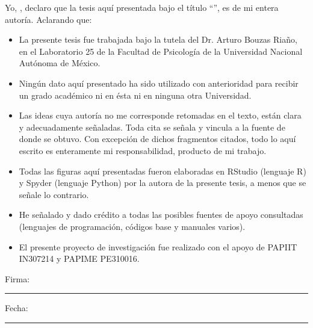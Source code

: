 \documentclass[
11pt, %
spanish, %
singlespacing, %
headsepline, %
]{MastersDoctoralThesis} %
\begin{document}
\begin{declaration}
\addchaptertocentry{\authorshipname} %
\noindent Yo, \authorname, declaro que la tesis aquí presentada bajo el título \enquote{\ttitle}, es de mi entera autoría. Aclarando que:\\

\begin{itemize} 
\item La presente tesis fue trabajada bajo la tutela del Dr. Arturo Bouzas Riaño, en el Laboratorio 25 de la Facultad de Psicología de la Universidad Nacional Autónoma de México.
\item Ningún dato aquí presentado ha sido utilizado con anterioridad para recibir un grado académico ni en ésta ni en ninguna otra Universidad. 
\item Las ideas cuya autoría no me corresponde retomadas en el texto, están clara y adecuadamente señaladas. Toda cita se señala y vincula a la fuente de donde se obtuvo. Con excepción de dichos fragmentos citados, todo lo aquí escrito es enteramente mi responsabilidad, producto de mi trabajo. 
\item Todas las figuras aquí presentadas fueron elaboradas en RStudio (lenguaje R) y Spyder (lenguaje Python) por la autora de la presente tesis, a menos que se señale lo contrario.
\item He señalado y dado crédito a todas las posibles fuentes de apoyo consultadas (lenguajes de programación, códigos base y manuales varios).
\item El presente proyecto de investigación fue realizado con el apoyo de PAPIIT IN307214 y PAPIME PE310016.\\
\end{itemize}
 
\noindent Firma:\\
\rule[0.5em]{25em}{0.5pt} %
 
\noindent Fecha:\\
\rule[0.5em]{25em}{0.5pt} %
\end{declaration}

\cleardoublepage

\end{document}
